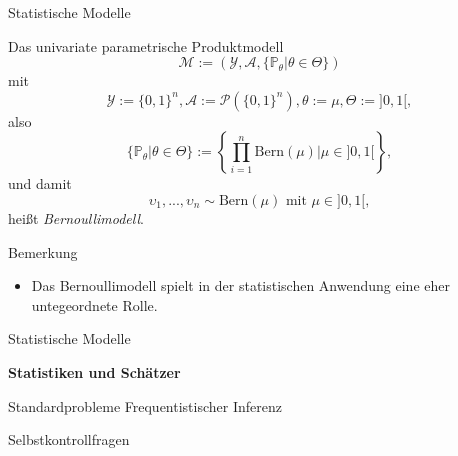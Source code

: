 \documentclass[
  8pt,
  ignorenonframetext,
]{beamer}
\providecommand{\tightlist}{%
  \setlength{\itemsep}{0pt}\setlength{\parskip}{0pt}}
\newcommand{\ups}{\upsilon}
\begin{document}
\begin{frame}{Statistische Modelle}
\protect\hypertarget{statistische-modelle-3}{}
\footnotesize
\begin{definition}[Bernoullimodell]
Das univariate parametrische Produktmodell
\begin{equation}
\mathcal{M} := \left(\mathcal{Y}, \mathcal{A}, \{\mathbb{P}_\theta|\theta \in \Theta\}\right)
\end{equation}
mit
\begin{equation}
\mathcal{Y} := \{0,1\}^n, \mathcal{A} := \mathcal{P}\left(\{0,1\}^n\right), \theta:= \mu, \Theta := ]0,1[,
\end{equation}
also
\begin{equation}
\{\mathbb{P}_\theta|\theta \in \Theta\} := \left\lbrace \prod_{i=1}^n \mbox{Bern}(\mu)|\mu \in ]0,1[ \right\rbrace,
\end{equation}
und damit
\begin{equation}
\ups_1,...,\ups_n \sim \mbox{Bern}(\mu) \mbox{ mit } \mu \in ]0,1[,
\end{equation}
heißt \textit{Bernoullimodell}.
\end{definition}

\footnotesize

Bemerkung

\begin{itemize}
\tightlist
\item
  Das Bernoullimodell spielt in der statistischen Anwendung eine eher
  untegeordnete Rolle.
\end{itemize}
\end{frame}

\begin{frame}{}
\protect\hypertarget{section-6}{}
\large
{}
\vfill

Statistische Modelle

\textbf{Statistiken und Schätzer}

Standardprobleme Frequentistischer Inferenz

Selbstkontrollfragen \vfill
\end{frame}
\end{document}
